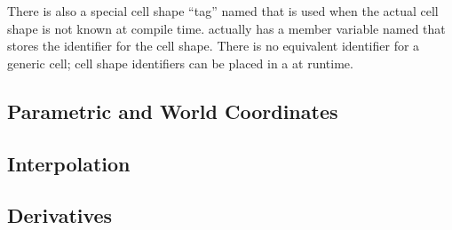 There is also a special cell shape ``tag'' named 
that is used when the actual cell shape is not known at compile time.
 actually has a member variable named
 that stores the identifier for the cell shape. There is no
equivalent identifier for a generic cell; cell shape identifiers can be
placed in a  at runtime.



\subsection{Parametric and World Coordinates}

\subsection{Interpolation}

\subsection{Derivatives}
